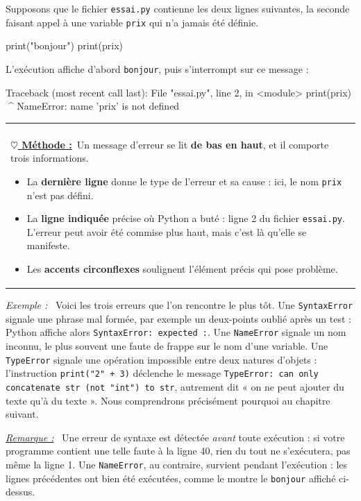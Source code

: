 \documentclass[a4paper,11pt,openany]{book}
\makeatletter
\newcommand{\code}[1]{\texttt{\textcolor{codebleu}{#1}}}
\newenvironment{cadre}%
 {\par\vspace{2mm}\noindent\begin{tabular}{|@{\hspace{4mm}}p{0.93\textwidth}@{\hspace{4mm}}|}
  \hline \\[-2mm]}%
 {\\[2mm] \hline \end{tabular}\par\vspace{3mm}}
\newcommand{\methode}{\textbf{\underline{$\heartsuit$ Méthode :}}~}
\newenvironment{exemple}%
 {\par\vspace{1mm}\begin{list}{}{\leftmargin=1cm \rightmargin=0.5cm}\item[]%
  \textit{Exemple :}~}%
 {\end{list}\vspace{1mm}}
\newenvironment{remarque}%
 {\par\vspace{1mm}\begin{list}{}{\leftmargin=1cm \rightmargin=0.5cm}\item[]%
  \textit{\underline{Remarque :}}~}%
 {\end{list}\vspace{1mm}}
\makeatother
\begin{document}
Supposons que le fichier \code{essai.py} contienne les deux lignes suivantes, la seconde faisant appel à une variable \code{prix} qui n'a jamais été définie.

\begin{python}
print("bonjour")
print(prix)
\end{python}

L'exécution affiche d'abord \code{bonjour}, puis s'interrompt sur ce message :

\begin{sortie}
Traceback (most recent call last):
  File "essai.py", line 2, in <module>
    print(prix)
          ^^^^
NameError: name 'prix' is not defined
\end{sortie}

\begin{cadre}
\methode Un message d'erreur se lit \textbf{de bas en haut}, et il comporte trois informations.
\begin{itemize}[leftmargin=6mm,itemsep=1mm,topsep=1mm]
\item La \textbf{dernière ligne} donne le type de l'erreur et sa cause : ici, le nom \code{prix} n'est pas défini.
\item La \textbf{ligne indiquée} précise où Python a buté : ligne 2 du fichier \code{essai.py}. L'erreur peut avoir été commise plus haut, mais c'est là qu'elle se manifeste.
\item Les \textbf{accents circonflexes} soulignent l'élément précis qui pose problème.
\end{itemize}
\end{cadre}

\begin{exemple}
Voici les trois erreurs que l'on rencontre le plus tôt. Une \code{SyntaxError} signale une phrase mal formée, par exemple un deux-points oublié après un test : Python affiche alors \code{SyntaxError: expected \textquotesingle:\textquotesingle}. Une \code{NameError} signale un nom inconnu, le plus souvent une faute de frappe sur le nom d'une variable. Une \code{TypeError} signale une opération impossible entre deux natures d'objets : l'instruction \code{print("2" + 3)} déclenche le message \code{TypeError: can only concatenate str (not "int") to str}, autrement dit « on ne peut ajouter du texte qu'à du texte ». Nous comprendrons précisément pourquoi au chapitre suivant.
\end{exemple}

\begin{remarque}
Une erreur de syntaxe est détectée \emph{avant} toute exécution : si votre programme contient une telle faute à la ligne 40, rien du tout ne s'exécutera, pas même la ligne 1. Une \code{NameError}, au contraire, survient pendant l'exécution : les lignes précédentes ont bien été exécutées, comme le montre le \code{bonjour} affiché ci-dessus.
\end{remarque}
\end{document}
